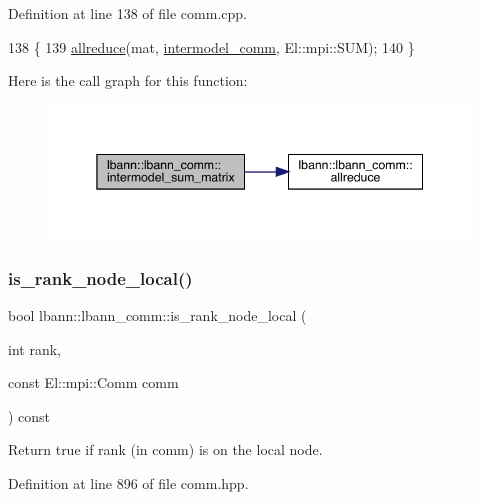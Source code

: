 Definition at line 138 of file comm.\+cpp.


\begin{DoxyCode}
138                                                       \{
139   \hyperlink{classlbann_1_1lbann__comm_af5631e5f0f54e4df4958eba9df2599ef}{allreduce}(mat, \hyperlink{classlbann_1_1lbann__comm_a2c51c5d8faf4f0ab4f43b892c55e597b}{intermodel\_comm}, El::mpi::SUM);
140 \}
\end{DoxyCode}
Here is the call graph for this function\+:\nopagebreak
\begin{figure}[H]
\begin{center}
\leavevmode
\includegraphics[width=345pt]{classlbann_1_1lbann__comm_a55edcd98bf4903235ed11eb7c96f5eb4_cgraph}
\end{center}
\end{figure}
\mbox{\label{classlbann_1_1lbann__comm_a5cdd318d1505ba0f31bf4fe9fadffacc}} 
\subsubsection{\texorpdfstring{is\+\_\+rank\+\_\+node\+\_\+local()}{is\_rank\_node\_local()}}
{\footnotesize\ttfamily bool lbann\+::lbann\+\_\+comm\+::is\+\_\+rank\+\_\+node\+\_\+local (\begin{DoxyParamCaption}\item[{int}]{rank,  }\item[{const El\+::mpi\+::\+Comm}]{comm }\end{DoxyParamCaption}) const\hspace{0.3cm}{\ttfamily [inline]}}

Return true if rank (in comm) is on the local node. 

Definition at line 896 of file comm.\+hpp.


